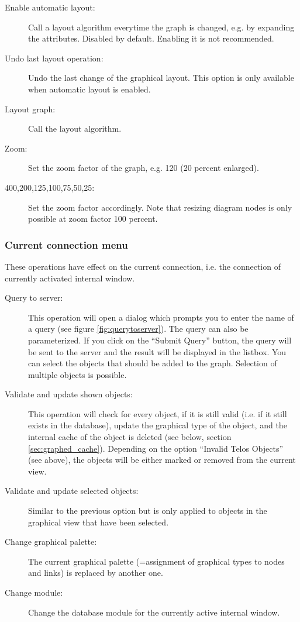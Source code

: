 \begin{description}
\item[Enable automatic layout:] Call a layout algorithm everytime the graph
is changed, e.g. by expanding the attributes. Disabled by default. Enabling
it is not recommended.
\item[Undo last layout operation:] Undo the last  change of the
graphical layout. This option is only available when automatic layout is enabled.
\item[Layout graph:] Call the layout algorithm.
\item[Zoom:] Set the zoom factor of the graph, e.g. 120 (20 percent enlarged).
\item[400,200,125,100,75,50,25:] Set the zoom factor accordingly. Note that
 resizing diagram nodes is only possible at zoom factor 100 percent.
\end{description}


\subsubsection{Current connection menu}
\label{sec:currentconnection}

These operations have effect on the current connection, i.e. the connection
of currently activated internal window.

\begin{description}
\item[Query to server:] This operation will open a dialog which prompts
you to enter the name of a query (see figure \ref{fig:querytoserver}).
The query can also be parameterized.
If you click on the ``Submit Query'' button, the query will be sent to
the server and the result will be displayed in the listbox. You can select
the objects that should be added to the graph. Selection of multiple objects is
possible.
\item[Validate and update shown objects:] This operation will check for
every object, if it is still valid (i.e. if it still exists in the database),
update the graphical type of the object, and the internal cache of the
object is deleted (see below, section \ref{sec:graphed_cache}). Depending on the option
``Invalid Telos Objects'' (see above), the objects will be either marked or removed
from the current view.
\item[Validate and update selected objects:] Similar to the previous option but
is only applied to objects in the graphical view that have been selected.
\item[Change graphical palette:] The current graphical palette (=assignment of
graphical types to nodes and links) is replaced by another one. 
\item[Change module:] Change the database module for the currently active internal window.
\end{description}

